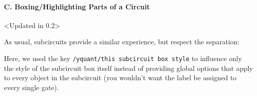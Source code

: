 \documentclass{scrartcl}
\makeatletter
\newenvironment{codeexample*}{%
   \VerbatimEnvironment%
   \let\FVB@VerbatimOut\minted@FVB@VerbatimOut
   \let\FVE@VerbatimOut\minted@FVE@VerbatimOut
   \minted@configlang{tex}%
   \minted@fvset
   \begin{VerbatimOut}[codes={\catcode`\^^I=12},firstline,lastline]{\minted@jobname.pyg}%
}{
   \end{VerbatimOut}%
   \minted@langlinenoson%
   \begin{adjustbox}{center}
       \minted@jobname.pyg %
   \end{adjustbox}\nopagebreak
   \expandafter\minted@pygmentize\expandafter{\minted@lang}%
   \minted@langlinenosoff%
   \par%
}
\def\ttlink{\link\texttt}
\makeatother
\begin{document}
            \paragraph{C. Boxing/Highlighting Parts of a Circuit}\leavevmode
               \begin{example}<Updated in 0.2>
                  \begin{codeexample*}
                  \end{codeexample*}
                  As usual, subcircuits provide a similar experience, but respect the separation:
                  \begin{codeexample*}
                  \end{codeexample*}
                  Here, we used the key \ttlink{/yquant/this subcircuit box style} to influence only the style of the subcircuit box itself instead of providing global options that apply to every object in the subcircuit (you wouldn't want the label be assigned to every single gate).
               \end{example}
\end{document}

